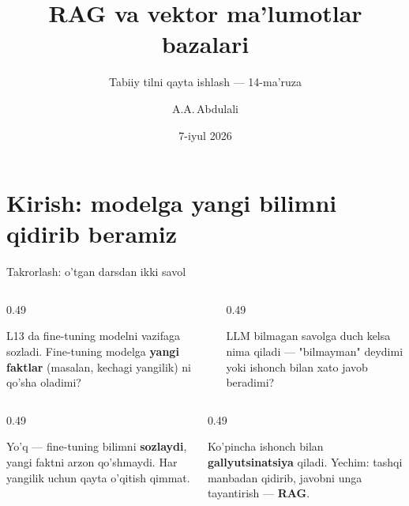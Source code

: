 \documentclass[aspectratio=169,11pt]{beamer}
\title[RAG]{RAG va vektor ma'lumotlar bazalari}
\subtitle{Tabiiy tilni qayta ishlash --- 14-ma'ruza}
\author[A.A.\,Abdulali]{A.A.\,Abdulali}
\date{7-iyul 2026}
\institute{11:00--12:20 \quad$\cdot$\quad mavzu \textnumero{}14}
\begin{document}

\maketitle

\section[Kirish]{Kirish: modelga yangi bilimni qidirib beramiz}

\begin{frame}{Takrorlash: o'tgan darsdan ikki savol}
  \begin{columns}[T]
    \begin{column}{0.49\textwidth}
      \begin{tcolorbox}[warnbox,title=1-savol]
        \small
        L13 da fine-tuning modelni vazifaga sozladi. Fine-tuning modelga
        \textbf{yangi faktlar} (masalan, kechagi yangilik) ni qo'sha oladimi?
      \end{tcolorbox}
    \end{column}
    \begin{column}{0.49\textwidth}
      \begin{tcolorbox}[warnbox,title=2-savol]
        \small
        LLM bilmagan savolga duch kelsa nima qiladi --- "bilmayman" deydimi
        yoki ishonch bilan xato javob beradimi?
      \end{tcolorbox}
    \end{column}
  \end{columns}
  \pause
  \vspace{4pt}
  \begin{columns}[T]
    \begin{column}{0.49\textwidth}
      \begin{tcolorbox}[okbox,title=1-javob]
        \small
        Yo'q --- fine-tuning bilimni \textbf{sozlaydi}, yangi faktni arzon
        qo'shmaydi. Har yangilik uchun qayta o'qitish qimmat.
      \end{tcolorbox}
    \end{column}
    \begin{column}{0.49\textwidth}
      \begin{tcolorbox}[okbox,title=2-javob]
        \small
        Ko'pincha ishonch bilan \textbf{gallyutsinatsiya} qiladi. Yechim:
        tashqi manbadan qidirib, javobni unga tayantirish --- \textbf{RAG}.
      \end{tcolorbox}
    \end{column}
  \end{columns}
\end{frame}
\end{document}
